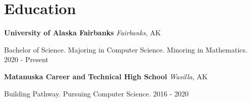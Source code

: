 ﻿\section{Education}

\textbf{University of Alaska Fairbanks} \hfill \textit{Fairbanks}, AK

Bachelor of Science. Majoring in Computer Science. Minoring in Mathematics. \hfill 2020 - Present

\bigbreak

\textbf{Matanuska Career and Technical High School} \hfill \textit{Wasilla}, AK

Building Pathway. Pursuing Computer Science. \hfill 2016 - 2020